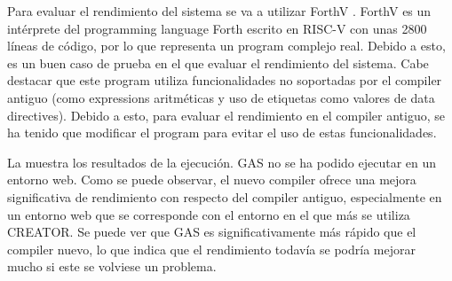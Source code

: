 \evalres


Para evaluar el rendimiento del sistema se va a utilizar ForthV
\parencite{ForthV}. ForthV es un intérprete del \gls{programming language} Forth
escrito en  RISC-V con unas 2800 líneas de
código, por lo que representa un \gls{program} complejo real. Debido a esto, es
un buen caso de prueba en el que evaluar el rendimiento del sistema. Cabe
destacar que este \gls{program} utiliza funcionalidades no soportadas por el
\gls{compiler} antiguo (como \glspl{expression} aritméticas y uso de etiquetas
como valores de \glspl{data directive}). Debido a esto, para evaluar el
rendimiento en el \gls{compiler} antiguo, se ha tenido que modificar el
\gls{program} para evitar el uso de estas funcionalidades.

La  muestra los resultados de la ejecución. \gls{GAS} no
se ha podido ejecutar en un entorno web. Como se puede observar, el nuevo
\gls{compiler} ofrece una mejora significativa de rendimiento con respecto del
\gls{compiler} antiguo, especialmente en un entorno web que se corresponde con
el entorno en el que más se utiliza CREATOR. Se puede ver que \gls{GAS} es
significativamente más rápido que el \gls{compiler} nuevo, lo que indica que el
rendimiento todavía se podría mejorar mucho si este se volviese un problema.

